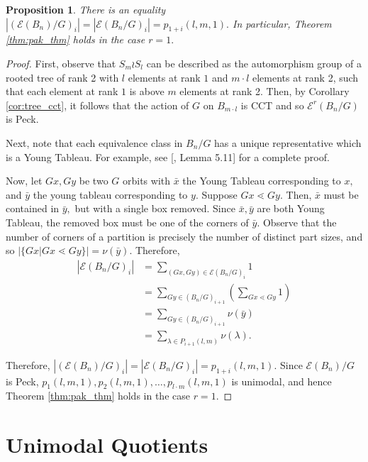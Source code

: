 \documentclass[10 pt]{amsart}
\theoremstyle{plain}
\newtheorem{prop}[thm]{Proposition}
\theoremstyle{definition}
\theoremstyle{remark}
\numberwithin{equation}{section}
\begin{document}
\begin{prop}
\label{prop:rank_gen_fn_wreath_1}
There is an equality $|(\mathcal E(B_n)/G)_i| = |\mathcal E(B_n/G)_i| = p_{1+i}(l,m,1).$ In particular, Theorem \ref{thm:pak_thm} holds in the case $r = 1.$
\end{prop}
\begin{proof}

First, observe that $S_m \wr S_l$ can be described as the automorphism group of a rooted tree of rank 2 with $l$ elements at rank $1$ and $m\cdot l$ elements at rank 2, such that each element at rank $1$ is above $m$ elements at rank 2. Then, by Corollary \ref{cor:tree_cct}, it follows that the action of $G$ on $B_{m \cdot l}$ is CCT and so $\mathcal E^r(B_n/G)$ is Peck.

Next, note that each equivalence class in $B_n/G$ has a unique representative which is a Young Tableau. For example, see [\cite{reu_report}, Lemma 5.11] for a complete proof.

Now, let $Gx,Gy$ be two $G$ orbits with $\bar x$ the Young Tableau corresponding to $x,$ and $\bar y$ the young tableau corresponding to $y.$ Suppose $Gx \lessdot Gy.$ Then, $\bar x$ must be contained in $\bar y,$ but with a single box removed. Since $\bar x,\bar y$ are both Young Tableau, the removed box must be one of the corners of $\bar y$. Observe that the number of corners of a partition is precisely the number of distinct part sizes, and so $|\{Gx|Gx \lessdot Gy\}| = \nu(\bar y).$ Therefore,
\begin{align*}
  |\mathcal E(B_n/G)_i| &= \sum_{(Gx,Gy) \in \mathcal E(B_n/G)_i} 1 
  \\
  &= \sum_{Gy \in (B_n/G)_{i+1}} \left(\sum_{Gx \lessdot Gy}^{} 1 \right) 
  \\
  &= \sum_{Gy \in (B_n/G)_{i+1}}\nu(\bar y) 
  \\
  &=  \sum_{\lambda \in P_{i+1}(l,m)} \nu(\lambda).
\end{align*}

Therefore, $|(\mathcal E(B_n)/G)_i| = |\mathcal E(B_n/G)_i| = p_{1+i}(l,m,1).$ Since $\mathcal E(B_n)/G$ is Peck,
\linebreak
$p_1(l,m,1), p_{2}(l,m,1),\ldots, p_{l\cdot m}(l,m,1)$ is unimodal, and hence Theorem \ref{thm:pak_thm} holds in the case $r = 1.$
\end{proof}



\section{Unimodal Quotients}
\label{sec:unimodal}
\end{document}
